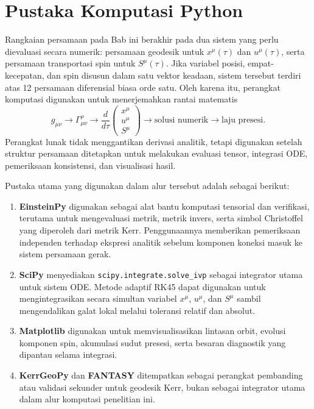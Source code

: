 \section{Pustaka Komputasi Python}
\label{sec:pustaka-python}

Rangkaian persamaan pada Bab ini berakhir pada dua sistem yang perlu
dievaluasi secara numerik: persamaan geodesik untuk $x^\mu(\tau)$ dan
$u^\mu(\tau)$, serta persamaan transportasi spin untuk $S^\mu(\tau)$.
Jika variabel posisi, empat-kecepatan, dan spin disusun dalam satu vektor
keadaan, sistem tersebut terdiri atas 12 persamaan diferensial biasa orde
satu. Oleh karena itu, perangkat komputasi digunakan untuk menerjemahkan
rantai matematis
\begin{equation}
    g_{\mu\nu}
    \longrightarrow
    \Gamma^\rho_{\mu\nu}
    \longrightarrow
    \frac{d}{d\tau}
    \begin{pmatrix}
        x^\mu\\
        u^\mu\\
        S^\mu
    \end{pmatrix}
    \longrightarrow
    \text{solusi numerik}
    \longrightarrow
    \text{laju presesi}.
    \label{eq:computational-chain}
\end{equation}
Perangkat lunak tidak menggantikan derivasi analitik, tetapi digunakan
setelah struktur persamaan ditetapkan untuk melakukan evaluasi tensor,
integrasi ODE, pemeriksaan konsistensi, dan visualisasi hasil.

Pustaka utama yang digunakan dalam alur tersebut adalah sebagai berikut:
\begin{enumerate}[label=(\roman*)]
    \item \textbf{EinsteinPy} \parencite{Bapat2020EinsteinPy} digunakan
    sebagai alat bantu komputasi tensorial dan verifikasi, terutama untuk
    mengevaluasi metrik, metrik invers, serta simbol Christoffel yang
    diperoleh dari metrik Kerr. Penggunaannya memberikan pemeriksaan
    independen terhadap ekspresi analitik sebelum komponen koneksi masuk ke
    sistem persamaan gerak.

    \item \textbf{SciPy} \parencite{SciPy2020} menyediakan
    \texttt{scipy.integrate.solve\_ivp} sebagai integrator utama untuk
    sistem ODE. Metode adaptif RK45 dapat digunakan untuk mengintegrasikan
    secara simultan variabel $x^\mu$, $u^\mu$, dan $S^\mu$ sambil
    mengendalikan galat lokal melalui toleransi relatif dan absolut.

    \item \textbf{Matplotlib} \parencite{Matplotlib2007} digunakan untuk
    memvisualisasikan lintasan orbit, evolusi komponen spin, akumulasi
    sudut presesi, serta besaran diagnostik yang dipantau selama integrasi.

    \item \textbf{KerrGeoPy} \parencite{Park2024KerrGeoPy} dan
    \textbf{FANTASY} \parencite{Christian2020FANTASY} ditempatkan sebagai
    perangkat pembanding atau validasi sekunder untuk geodesik Kerr, bukan
    sebagai integrator utama dalam alur komputasi penelitian ini.
\end{enumerate}

